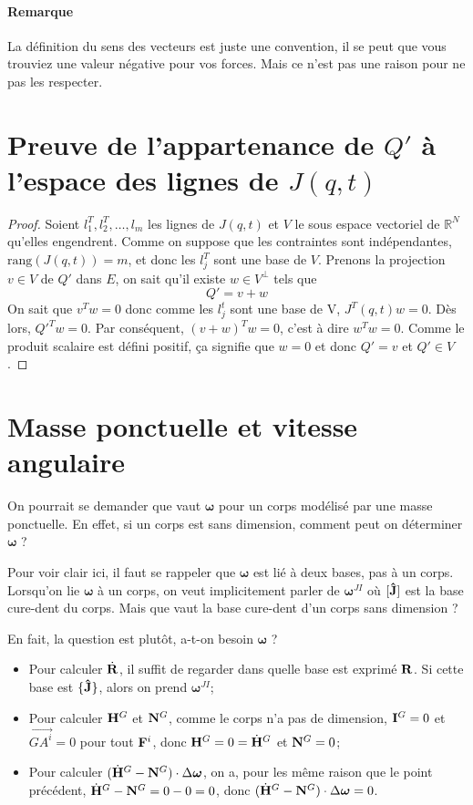\documentclass[11pt,a4paper]{article}
\newcommand\fv[1]{{\bf #1}} %
\newcommand\fvd[1]{\dot{\bf #1}} %
\newcommand\uj{{\bf\hat{J}}} %
\newcommand\omegaf{{\bm \omega}}
\newcommand\ine{{\bf I}}
\newcommand\lm{{\bf N}}
\newcommand\am{{\bf H}}
\newcommand\amd{\dot{\am}}
\newcommand\fo{{\bf F}}
\newcommand\xg{\ensuremath{\fv{R}}}
\newcommand\xgd{\ensuremath{\fvd{R}}}
\begin{document}
\paragraph{Remarque}
La définition du sens des vecteurs est juste une convention, il se peut que vous trouviez une valeur négative pour vos forces.
Mais ce n'est pas une raison pour ne pas les respecter.

\appendix
\section{Preuve de l'appartenance de $Q'$ à l'espace des lignes de $J(q, t)$}
\label{ann:orthogonal}
\begin{proof}
Soient $l_1^T, l_2^T, \ldots, l_m$ les lignes de $J(q, t)$ et $V$ le sous espace vectoriel de $\mathbb{R}^N$ qu'elles engendrent.
Comme on suppose que les contraintes sont indépendantes, $\mathrm{rang}(J(q, t)) = m$, et donc les $l_j^T$ sont une base de $V$.
Prenons la projection $v \in V$ de $Q'$ dans $E$, on sait qu'il existe $w \in V^\perp$ tels que
\[ Q' = v + w \]
On sait que $v^Tw = 0$ donc comme les $l_j^t$ sont une base de V, $J^T(q, t)w = 0$.
Dès lors, $Q'^T w = 0$.
Par conséquent, $(v + w)^T w = 0$, c'est à dire $w^T w = 0$.
Comme le produit scalaire est défini positif, ça signifie que $w = 0$ et donc $Q' = v$ et $Q' \in V$.
\end{proof}

\section{Masse ponctuelle et vitesse angulaire}
On pourrait se demander que vaut $\omegaf$ pour un corps modélisé par une masse ponctuelle.
En effet, si un corps est sans dimension, comment peut on déterminer $\omegaf$ ?

Pour voir clair ici, il faut se rappeler que $\omegaf$ est lié à deux bases, pas à un corps.
Lorsqu'on lie $\omegaf$ à un corps, on veut implicitement parler de $\omegaf^{JI}$ où $[\uj]$ est la base cure-dent du corps.
Mais que vaut la base cure-dent d'un corps sans dimension ?

En fait, la question est plutôt, a-t-on besoin $\omegaf$ ?
\begin{itemize}
	\item Pour calculer $\xgd$,
		il suffit de regarder dans quelle base est exprimé $\xg$.
		Si cette base est $\{\uj\}$, alors on prend $\omegaf^{JI}$;
	\item Pour calculer $\am^G$ et $\lm^G$, comme le corps n'a pas de dimension, $\ine^G = 0$ et $\vec{GA^i} = 0$ pour tout $\fo^i$, donc
		$\am^G = 0 = \amd^G$ et $\lm^G = 0$;
	\item Pour calculer $(\amd^G - \lm^G) \cdot \Delta \omegaf$, on a, pour les même raison que le point précédent,
		$\amd^G - \lm^G = 0 - 0 = 0$, donc $(\amd^G - \lm^G) \cdot \Delta \omegaf = 0$.
\end{itemize}
\end{document}
